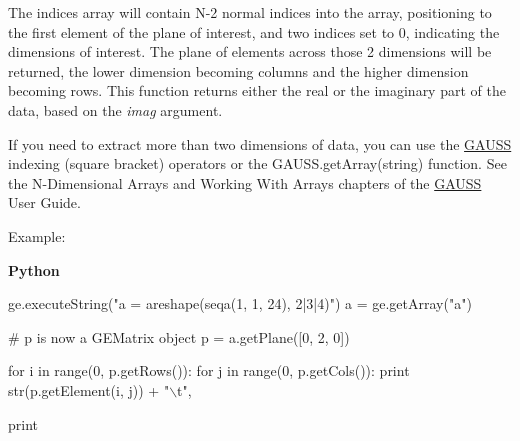 The indices array will contain N-\/2 normal indices into the array, positioning to the first element of the plane of interest, and two indices set to 0, indicating the dimensions of interest. The plane of elements across those 2 dimensions will be returned, the lower dimension becoming columns and the higher dimension becoming rows. This function returns either the real or the imaginary part of the data, based on the {\itshape imag} argument.

If you need to extract more than two dimensions of data, you can use the \hyperlink{class_g_a_u_s_s}{G\+A\+U\+SS} indexing (square bracket) operators or the G\+A\+U\+S\+S.\+get\+Array(string) function. See the N-\/\+Dimensional Arrays and Working With Arrays chapters of the \hyperlink{class_g_a_u_s_s}{G\+A\+U\+SS} User Guide.

Example\+:

{\bfseries Python} 
\begin{DoxyCode}
ge.executeString(\textcolor{stringliteral}{"a = areshape(seqa(1, 1, 24), 2|3|4)"})
a = ge.getArray(\textcolor{stringliteral}{"a"})

\textcolor{comment}{# p is now a GEMatrix object}
p = a.getPlane([0, 2, 0])

\textcolor{keywordflow}{for} i \textcolor{keywordflow}{in} range(0, p.getRows()):
    \textcolor{keywordflow}{for} j \textcolor{keywordflow}{in} range(0, p.getCols()):
        \textcolor{keywordflow}{print} str(p.getElement(i, j)) + \textcolor{stringliteral}{"\(\backslash\)t"},

    \textcolor{keywordflow}{print}
\end{DoxyCode}


